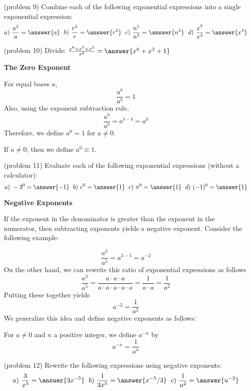 \documentclass[handout]{ximera}
\begin{document}
\begin{problem}(problem 9)
Combine each of the following exponential expressions into a single exponential expression:
\[
a) \ \frac{a^2}{a} = \answer{a}  \; \  b) \ \frac{r^3}{r} = \answer{r^2}  \; \  c) \ \frac{n^5}{n^3} = \answer{n^2} 
 \; \  d) \ \frac{x^7}{x^3} = \answer{x^4}
\]
\end{problem}


\begin{problem}(problem 10)
Divide: $\frac{x^8 + x^5 + x^2}{x^2} = \answer{x^6 + x^3 + 1}$
\end{problem}


\begin{center}
\textbf{The Zero Exponent}
\end{center}
For equal bases $a$,
\[
\frac{a^b}{a^b} = 1
\] 
Also, using the exponent subtraction rule, 
\[
\frac{a^b}{a^b} = a^{b-b} = a^0
\] 
Therefore, we define $a^0 = 1$ for $a \neq 0$.

\begin{definition} 
If $a \neq 0$, then we define $a^0 \equiv 1$.
\end{definition}

\begin{problem}(problem 11)
Evaluate each of the following exponential expressions (without a calculator):
\[
a) \ -3^0 = \answer{-1}  \; \  b) \ e^0 = \answer{1}  \; \  c) \ \pi^0 = \answer{1}  \; \  d) \ (-1)^0 = \answer{1}
\]
\end{problem}

\begin{center}
\textbf{Negative Exponents}
\end{center}
If the exponent in the denominator is greater than the exponent in the numerator, 
then subtracting exponents yields a negative exponent. Consider the following example:

\[
\frac{a^3}{a^5} = a^{3-5} = a^{-2}
\]
On the other hand, we can rewrite this ratio of exponential expressions as follows
\[
\frac{a^3}{a^5} = \frac{a\cdot a\cdot a}{a\cdot a\cdot a \cdot a\cdot a} = \frac{1}{a\cdot a} = \frac{1}{a^2}
\]
Putting these together yields
\[
a^{-2} = \frac{1}{a^2}
\]
We generalize this idea and define negative exponents as follows:
\begin{definition} For $a \neq 0$ and $n$ a positive integer, we define $a^{-n}$ by
\[
a^{-n} = \frac{1}{a^n}
\]
\end{definition}

\begin{problem}(problem 12)
Rewrite the following expressions using negative exponents:
\[
a) \ \frac{3}{x^5} = \answer{3x^{-5}}  \; \ b) \ \frac{1}{3x^5} = \answer{x^{-5}/3}  \; \ c) \ \frac{1}{u^2} = \answer{u^{-2}}
\]
\end{problem}
\end{document}
